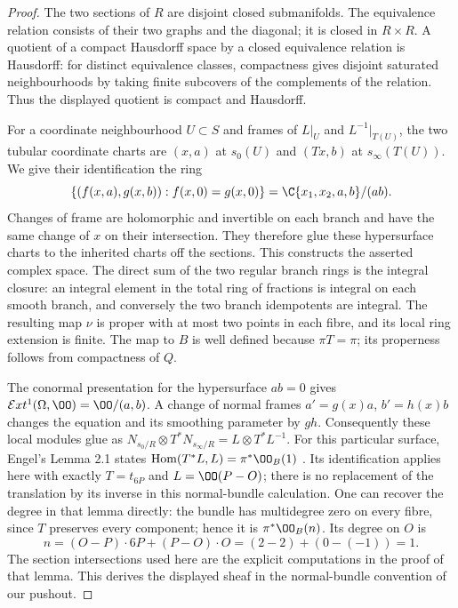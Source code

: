 \begin{proof}
The two sections of $R$ are disjoint closed submanifolds. The
equivalence relation consists of their two graphs and the diagonal;
it is closed in $R\times R$. A quotient of a compact Hausdorff space
by a closed equivalence relation is Hausdorff: for distinct equivalence
classes, compactness gives disjoint saturated neighbourhoods by taking
finite subcovers of the complements of the relation. Thus the displayed
quotient is compact and Hausdorff.

For a coordinate neighbourhood $U\subset S$ and frames of $L|_U$ and
$L^{-1}|_{T(U)}$, the two tubular coordinate charts are $(x,a)$ at
$s_0(U)$ and $(Tx,b)$ at $s_\infty(T(U))$. We give their identification
the ring
\[
 \{(f(x,a),g(x,b)):f(x,0)=g(x,0)\}
   =\C\{x_1,x_2,a,b\}/(ab).
\]
Changes of frame are holomorphic and invertible on each branch and
have the same change of $x$ on their intersection. They therefore glue
these hypersurface charts to the inherited charts off the sections.
This constructs the asserted complex space. The direct sum of the two
regular branch rings is the integral closure: an integral element in
the total ring of fractions is integral on each smooth branch, and
conversely the two branch idempotents are integral. The resulting map
$\nu$ is proper with at most two points in each fibre, and its local
ring extension is finite. The map to $B$ is well defined because
$\pi T=\pi$; its properness follows from compactness of $Q$.

The conormal presentation for the hypersurface $ab=0$ gives
$\mathcal Ext^1(\Omega,\OO)=\OO/(a,b)$. A change of normal frames
$a'=g(x)a$, $b'=h(x)b$ changes the equation and its smoothing parameter
by $gh$. Consequently these local modules glue as
$N_{s_0/R}\otimes T^*N_{s_\infty/R}=L\otimes T^*L^{-1}$.
For this particular surface, Engel's Lemma 2.1 states
$\operatorname{Hom}(T^*L,L)=\pi^*\OO_B(1)$ \cite[Lemma 2.1]{Engel2026}.
Its identification applies here with exactly $T=t_{6P}$ and $L=\OO(P-O)$;
there is no replacement of the translation by its inverse in this
normal-bundle calculation. One can recover the degree in that lemma
directly: the bundle has multidegree zero on every fibre, since $T$
preserves every component; hence it is $\pi^*\OO_B(n)$. Its degree on
$O$ is
\[
 n=(O-P)\cdot 6P+(P-O)\cdot O=(2-2)+(0-(-1))=1.
\]
The section intersections used here are the explicit computations in
the proof of that lemma. This derives the displayed sheaf in the
normal-bundle convention of our pushout.
\end{proof}

